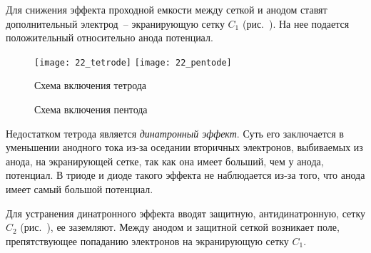 Для снижения эффекта проходной емкости между сеткой и анодом ставят
дополнительный электрод~-- экранирующую сетку \( C_1 \) (рис.~).
На нее подается положительный относительно анода потенциал.
\begin{figure}[h!]
  \vspace{-1em}
  \center
  \texttt{[image: 22\_tetrode]} \hspace{1em}
  \texttt{[image: 22\_pentode]} \\
  \parbox{.3\textwidth}{\caption{Схема включения тетрода} \label{pic22tetrode}}
    \hspace{1em}
  \parbox{.3\textwidth}{\caption{Схема включения пентода} \label{pic22pentode}}
  \vspace{-1.5em}
\end{figure}

Недостатком тетрода является \emph{динатронный эффект}. Суть его заключается в
уменьшении анодного тока из-за оседании вторичных электронов, выбиваемых из
анода, на экранирующей сетке, так как она имеет больший, чем у анода, потенциал.
В триоде и диоде такого эффекта не наблюдается из-за того, что анода имеет самый
большой потенциал.


Для устранения динатронного эффекта вводят защитную, антидинатронную, сетку
\( C_2 \) (рис.~), ее заземляют. Между анодом и защитной сеткой
возникает поле, препятствующее попаданию электронов на экранирующую сетку
\( C_1 \).
